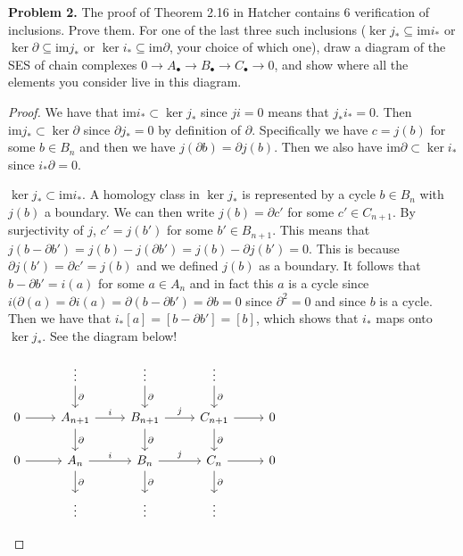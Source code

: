 \documentclass[leqno]{article}
\theoremstyle{nonumberplain}
\newtheorem{proof}{Proof}
\newcommand{\im}{\mathrm{im}}
\begin{document}
\vspace*{1cm}


\noindent\textbf{Problem 2.} The proof of Theorem 2.16 in Hatcher contains 6 verification of inclusions. Prove them. For one of the last three such inclusions ($\ker j_* \subseteq \im i_*$ or $\ker \partial \subseteq \im j_*$ or $\ker i_* \subseteq \im \partial$, your choice of which one), draw a diagram of the SES of chain complexes $0\to A_\bullet \to B_\bullet \to C_\bullet \to 0$, and show where all the elements you consider live in this diagram.

\begin{proof}
We have that $\im i_* \subset \ker j_*$ since $ji=0$ means that $j_*i_*=0$.  Then $\im j_* \subset \ker \partial$ since $\partial j_*=0$ by definition of $\partial$. Specifically we have $c=j(b)$ for some $b\in B_n$ and then we have $j(\partial b)=\partial j(b)$. Then we also have $\im \partial \subset \ker i_*$ since $i_*\partial = 0$.

$\ker j_* \subset \im i_*$. A homology class in $\ker j_*$ is represented by a cycle $b\in B_n$ with $j(b)$ a boundary. We can then write $j(b)=\partial c'$ for some $c'\in C_{n+1}$.  By surjectivity of $j$, $c'=j(b')$ for some $b'\in B_{n+1}$. This means that $j(b-\partial b')=j(b)-j(\partial b')=j(b)-\partial j(b')=0$. This is because $\partial j(b')=\partial c'=j(b)$ and we defined $j(b)$ as a boundary. It follows that $b-\partial b'=i(a)$ for some $a\in A_n$ and in fact this $a$ is a cycle since $i(\partial(a)=\partial i(a)=\partial(b-\partial b')=\partial b=0$ since $\partial^2=0$ and since $b$ is a cycle.  Then we have that $i_*[a]=[b-\partial b']=[b]$, which shows that $i_*$ maps onto $\ker j_*$. See the diagram below!

\begin{center}
$
\begin{tikzcd}
 & \vdots \arrow[d, "\partial"] & \vdots \arrow[d, "\partial"] & \vdots \arrow[d, "\partial"] &  \\
0 \arrow[r] & A_{n+1} \arrow[d, "\partial"] \arrow[r, "i"] & B_{n+1} \arrow[d, "\partial"] \arrow[r, "j"] & C_{n+1} \arrow[d, "\partial"] \arrow[r] & 0 \\
0 \arrow[r] & A_n \arrow[d, "\partial"] \arrow[r, "i"] & B_n \arrow[d, "\partial"] \arrow[r, "j"] & C_n \arrow[d, "\partial"] \arrow[r] & 0 \\
 & \vdots & \vdots & \vdots & 
\end{tikzcd}
$
\end{center}


\end{proof}
\end{document}

